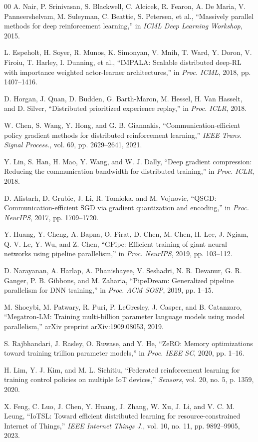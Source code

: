 \documentclass[conference]{IEEEtran}
\begin{document}
\begin{thebibliography}{00}
 A. Nair, P. Srinivasan, S. Blackwell, C. Alcicek, R. Fearon, A. De Maria, V. Panneershelvam, M. Suleyman, C. Beattie, S. Petersen, et al., ``Massively parallel methods for deep reinforcement learning,'' in \textit{ICML Deep Learning Workshop}, 2015.

 L. Espeholt, H. Soyer, R. Munos, K. Simonyan, V. Mnih, T. Ward, Y. Doron, V. Firoiu, T. Harley, I. Dunning, et al., ``IMPALA: Scalable distributed deep-RL with importance weighted actor-learner architectures,'' in \textit{Proc. ICML}, 2018, pp. 1407--1416.

 D. Horgan, J. Quan, D. Budden, G. Barth-Maron, M. Hessel, H. Van Hasselt, and D. Silver, ``Distributed prioritized experience replay,'' in \textit{Proc. ICLR}, 2018.

 W. Chen, S. Wang, Y. Hong, and G. B. Giannakis, ``Communication-efficient policy gradient methods for distributed reinforcement learning,'' \textit{IEEE Trans. Signal Process.}, vol. 69, pp. 2629--2641, 2021.

 Y. Lin, S. Han, H. Mao, Y. Wang, and W. J. Dally, ``Deep gradient compression: Reducing the communication bandwidth for distributed training,'' in \textit{Proc. ICLR}, 2018.

 D. Alistarh, D. Grubic, J. Li, R. Tomioka, and M. Vojnovic, ``QSGD: Communication-efficient SGD via gradient quantization and encoding,'' in \textit{Proc. NeurIPS}, 2017, pp. 1709--1720.

 Y. Huang, Y. Cheng, A. Bapna, O. Firat, D. Chen, M. Chen, H. Lee, J. Ngiam, Q. V. Le, Y. Wu, and Z. Chen, ``GPipe: Efficient training of giant neural networks using pipeline parallelism,'' in \textit{Proc. NeurIPS}, 2019, pp. 103--112.

 D. Narayanan, A. Harlap, A. Phanishayee, V. Seshadri, N. R. Devanur, G. R. Ganger, P. B. Gibbons, and M. Zaharia, ``PipeDream: Generalized pipeline parallelism for DNN training,'' in \textit{Proc. ACM SOSP}, 2019, pp. 1--15.

 M. Shoeybi, M. Patwary, R. Puri, P. LeGresley, J. Casper, and B. Catanzaro, ``Megatron-LM: Training multi-billion parameter language models using model parallelism,'' arXiv preprint arXiv:1909.08053, 2019.

 S. Rajbhandari, J. Rasley, O. Ruwase, and Y. He, ``ZeRO: Memory optimizations toward training trillion parameter models,'' in \textit{Proc. IEEE SC}, 2020, pp. 1--16.

 H. Lim, Y. J. Kim, and M. L. Sichitiu, ``Federated reinforcement learning for training control policies on multiple IoT devices,'' \textit{Sensors}, vol. 20, no. 5, p. 1359, 2020.

 X. Feng, C. Luo, J. Chen, Y. Huang, J. Zhang, W. Xu, J. Li, and V. C. M. Leung, ``IoTSL: Toward efficient distributed learning for resource-constrained Internet of Things,'' \textit{IEEE Internet Things J.}, vol. 10, no. 11, pp. 9892--9905, 2023.
\end{thebibliography}
\end{document}
